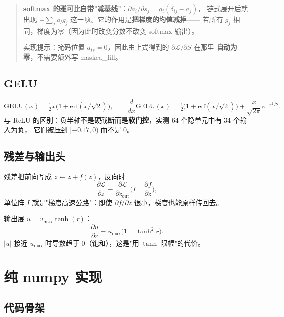 \documentclass[11pt,a4paper]{ctexart}
\newcommand{\keypoint}[1]{\par\medskip\noindent\colorbox{cyan!6}{%
  \begin{minipage}{\dimexpr\linewidth-2\fboxsep}\small #1\end{minipage}}\par\medskip}
\begin{document}
\begin{quote}
\textbf{softmax 的雅可比自带"减基线"}：$\partial a_i/\partial s_j=a_i(\delta_{ij}-a_j)$，
链式展开后就出现 $-\sum_j a_j g_j$ 这一项。它的作用是\textbf{把梯度的均值减掉}——
若所有 $g_j$ 相同，梯度为零（因为此时改变分数不改变 softmax 输出）。
\keypoint{实现提示：掩码位置 $a_{ts}=0$，因此由上式得到的 $\partial\mathcal{L}/\partial S$ 在那里
\textbf{自动为零}，不需要额外写 masked\_fill。}
\end{quote}

\subsection{GELU}

\begin{equation}
  \mathrm{GELU}(x)=\tfrac12x\big(1+\mathrm{erf}(x/\sqrt2)\big),\qquad
  \frac{d}{dx}\mathrm{GELU}(x)=\tfrac12\big(1+\mathrm{erf}(x/\sqrt2)\big)
  +\frac{x}{\sqrt{2\pi}}e^{-x^2/2}.
\end{equation}
与 ReLU 的区别：负半轴不是硬截断而是\textbf{软门控}，实测 $64$ 个隐单元中有 $34$ 个输入为负，
它们被压到 $[-0.17,0)$ 而不是 $0$。

\subsection{残差与输出头}

残差把前向写成 $z\leftarrow z+f(z)$，反向时
\begin{equation}
  \frac{\partial\mathcal{L}}{\partial z}=\frac{\partial\mathcal{L}}{\partial z_{\text{out}}}
  \Big(I+\frac{\partial f}{\partial z}\Big),
\end{equation}
单位阵 $I$ 就是"梯度高速公路"：即使 $\partial f/\partial z$ 很小，梯度也能原样传回去。

输出层 $u=u_{\max}\tanh(r)$：
\begin{equation}
  \frac{\partial u}{\partial r}=u_{\max}\big(1-\tanh^2r\big).
\end{equation}
$|u|$ 接近 $u_{\max}$ 时导数趋于 $0$（饱和），这是"用 $\tanh$ 限幅"的代价。

\section{纯 numpy 实现}

\subsection{代码骨架}
\end{document}
